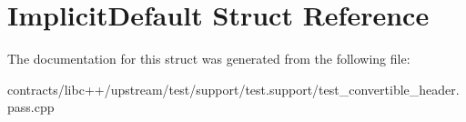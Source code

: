\hypertarget{struct_implicit_default}{}\section{Implicit\+Default Struct Reference}
\label{struct_implicit_default}


The documentation for this struct was generated from the following file\+:\begin{DoxyCompactItemize}
\item 
contracts/libc++/upstream/test/support/test.\+support/test\+\_\+convertible\+\_\+header.\+pass.\+cpp\end{DoxyCompactItemize}

